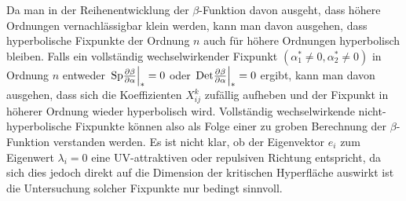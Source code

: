       
      
      Da man in der Reihenentwicklung der $\beta$-Funktion davon ausgeht, 
      dass höhere Ordnungen vernachlässigbar klein werden, kann man davon 
      ausgehen, dass hyperbolische Fixpunkte der 
      Ordnung $n$ auch für höhere Ordnungen hyperbolisch bleiben. Falls ein 
      vollständig wechselwirkender Fixpunkt $(\alpha_1^*\neq 0,
	 \alpha_2^*\neq 0)$ in Ordnung $n$ entweder $\left.\text{Sp} \frac{\partial \beta}{\partial \alpha} \right|_*=0$ 
	 oder $\left. \text{Det} \frac{\partial \beta}{\partial \alpha} \right|_*=0$ ergibt, kann man davon ausgehen, dass 
	 sich die Koeffizienten $X^k_{ij}$ zufällig aufheben und der Fixpunkt in 
	 höherer Ordnung wieder hyperbolisch wird. Vollständig 
	 wechselwirkende nicht-hyperbolische Fixpunkte können also als Folge 
	 einer zu groben Berechnung der $\beta$-Funktion verstanden werden. 
	 Es ist nicht klar, ob der Eigenvektor $e_i$ zum Eigenwert $\lambda_i=0$ 
	 eine UV-attraktiven oder repulsiven Richtung entspricht, da sich dies 
	 jedoch direkt auf die Dimension der kritischen Hyperfläche auswirkt ist 
	 die Untersuchung solcher Fixpunkte nur bedingt sinnvoll.

